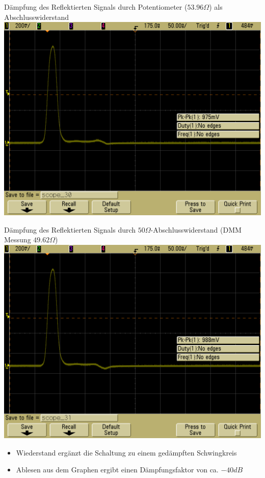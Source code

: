 \documentclass[compress,11pt]{beamer}
\begin{document}
\begin{frame}
\begin{block}{Dämpfung des Reflektierten Signals durch Potentiometer ($53.96\Omega$) als Abschlusswiderstand}
\centering
\includegraphics[width=.85\textwidth]{../daten/scope_30.png}
\end{block}
\end{frame}

\begin{frame}
\begin{block}{Dämpfung des Reflektierten Signals durch $50\Omega$-Abschlusswiderstand (DMM Messung $49.62\Omega$)}
\centering
\includegraphics[width=.85\textwidth]{../daten/scope_31.png}
\end{block}
\end{frame}

\begin{frame}
\begin{itemize}
\item Wiederstand ergänzt die Schaltung zu einem gedämpften Schwingkreis
\item Ablesen aus dem Graphen ergibt einen Dämpfungsfaktor von ca. $-40 dB$
\end{itemize}
\end{frame}
\end{document}
